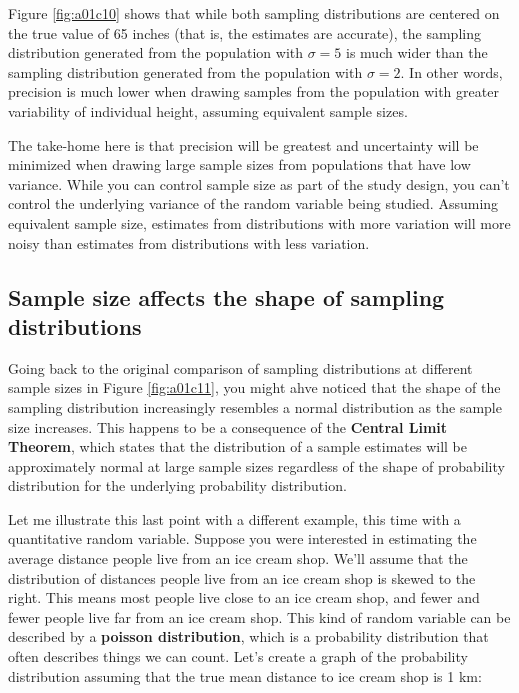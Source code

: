 \documentclass[
]{book}
\begin{document}
Figure \ref{fig:a01c10} shows that while both sampling distributions are centered on the true value of 65 inches (that is, the estimates are accurate), the sampling distribution generated from the population with \(\sigma=5\) is much wider than the sampling distribution generated from the population with \(\sigma=2\). In other words, precision is much lower when drawing samples from the population with greater variability of individual height, assuming equivalent sample sizes.

The take-home here is that precision will be greatest and uncertainty will be minimized when drawing large sample sizes from populations that have low variance. While you can control sample size as part of the study design, you can't control the underlying variance of the random variable being studied. Assuming equivalent sample size, estimates from distributions with more variation will more noisy than estimates from distributions with less variation.

\subsection{Sample size affects the shape of sampling distributions}\label{sample-size-affects-the-shape-of-sampling-distributions}

Going back to the original comparison of sampling distributions at different sample sizes in Figure \ref{fig:a01c11}, you might ahve noticed that the shape of the sampling distribution increasingly resembles a normal distribution as the sample size increases. This happens to be a consequence of the \textbf{Central Limit Theorem}, which states that the distribution of a sample estimates will be approximately normal at large sample sizes regardless of the shape of probability distribution for the underlying probability distribution.

Let me illustrate this last point with a different example, this time with a quantitative random variable. Suppose you were interested in estimating the average distance people live from an ice cream shop. We'll assume that the distribution of distances people live from an ice cream shop is skewed to the right. This means most people live close to an ice cream shop, and fewer and fewer people live far from an ice cream shop. This kind of random variable can be described by a \textbf{poisson distribution}, which is a probability distribution that often describes things we can count. Let's create a graph of the probability distribution assuming that the true mean distance to ice cream shop is 1 km:
\end{document}
